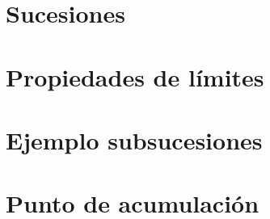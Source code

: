 \section{Sucesiones}

\section{Propiedades de límites}

\section{Ejemplo subsucesiones}

\section{Punto de acumulación}
